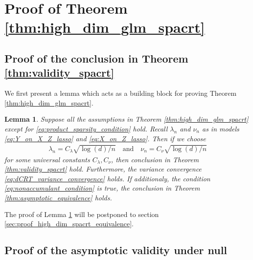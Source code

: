 \documentclass[12pt]{article}
\newtheorem{lemma}{Lemma}
\theoremstyle{definition}
\begin{document}
\section{Proof of Theorem \ref{thm:high_dim_glm_spacrt}}


\subsection{Proof of the conclusion in Theorem \ref{thm:validity_spacrt}}

We first present a lemma which acts as a building block for proving Theorem \ref{thm:high_dim_glm_spacrt}.


\begin{lemma}\label{lem:high_dim_glm_spacrt}
  Suppose all the assumptions in Theorem \ref{thm:high_dim_glm_spacrt} except for \eqref{eq:product_sparsity_condition} hold. Recall $\lambda_n$ and $\nu_n$ as in models \eqref{eq:Y_on_X_Z_lasso} and \eqref{eq:X_on_Z_lasso}. Then if we choose 
  \begin{align*}
    \lambda_n=C_{\lambda} \sqrt{\log(d)/n}\quad\text{and}\quad\nu_n=C_{\nu}\sqrt{\log(d)/n}
  \end{align*}
  for some universal constants $C_\lambda,C_\nu$, then conclusion in Theorem \ref{thm:validity_spacrt} hold. Furthermore, the variance convergence \eqref{eq:dCRT_variance_convergence} holds. If additionaly, the condition \eqref{eq:nonaccumulant_condition} is true, the conclusion in Theorem \ref{thm:asymptotic_equivalence} holds.
\end{lemma}
\noindent The proof of Lemma \ref{lem:high_dim_glm_spacrt} will be postponed to section \ref{sec:proof_high_dim_spacrt_equivalence}. 

\subsection{Proof of the asymptotic validity under null}
\end{document}

